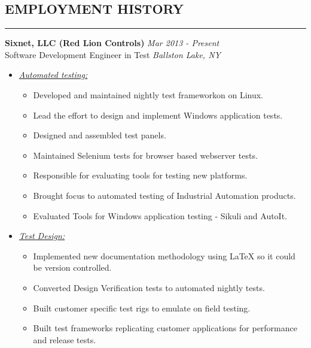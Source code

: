 \documentclass{article}
\begin{document}
\subsection*{\MakeUppercase{\bf Employment History}}
    \hrule
    \bigskip
    {\bf Sixnet, LLC (Red Lion Controls)} \hfill {\em Mar 2013 - Present} \\
    Software Development Engineer in Test \hfill {\em Ballston Lake, NY} \\
    \begin{itemize}
    \item \underline{\it Automated testing:}
          \begin{itemize}
          \item Developed and maintained nightly test frameworkon on Linux.
          \item Lead the effort to design and implement Windows application
                tests.
          \item Designed and assembled test panels.
          \item Maintained Selenium tests for browser based webserver tests.
          \item Responsible for evaluating tools for testing new platforms.
          \item Brought focus to automated testing of Industrial Automation
                products.
          \item Evaluated Tools for Windows application testing - Sikuli and
                AutoIt.
          \end{itemize}
    \item \underline{\it Test Design:}
          \begin{itemize}
          \item Implemented new documentation methodology using {\LaTeX} so
                it could be version controlled.
          \item Converted Design Verification tests to automated nightly tests.
          \item Built customer specific test rigs to emulate on field testing.
          \item Built test frameworks replicating customer applications for
                performance and release tests.
          \end{itemize}
    \end{itemize}
    \bigskip
\end{document}
